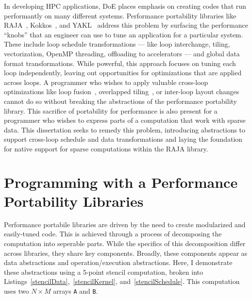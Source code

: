 In developing HPC applications, DoE places emphasis on creating codes that run performantly on many different systems.
Performance portability libraries like RAJA~\cite{hornung2014RAJA}, Kokkos~\cite{edwards2014kokkos}, and YAKL~\cite{norman2022portable} address this problem by surfacing the performance ``knobs'' that an engineer can use to tune an application for a particular system. 
These include loop schedule transformations --- like loop interchange, tiling, vectorization, OpenMP threading, offloading to accelerators --- and global data format transformations.
While powerful, this approach focuses on tuning each loop independently, leaving out opportunities for optimizations that are applied across loops.
A programmer who wishes to apply valuable cross-loop optimizations like loop fusion~\cite{todo}, overlapped tiling~\cite{bertolacci2019using,todoCathySCPaper, todoOVerlappedTilingIntroPaper}, or inter-loop layout changes~\cite{kennedy1995automatic,kennedy1998automatic} cannot do so without breaking the abstractions of the performance portability library.
This sacrifice of portability for performance is also present for a programmer who wishes to express parts of a computation that work with sparse data.
This dissertation seeks to remedy this problem, introducing abstractions to support cross-loop schedule and data transformations and laying the foundation for native support for sparse computations within the RAJA library.

\section{Programming with a Performance Portability Libraries}
Performance portabile libraries are driven by the need to create modularized and easily-tuned code.
This is achieved through a process of decomposing the computation into seperable parts.
While the specifics of this decomposition differ across libraries, they share key components.
Broadly, these components appear as data abstractions and operation/execution abstractions.
Here, I demonstrate these abstractions using a 5-point stencil computation, broken into Listings~\ref{stencilData},~\ref{stencilKernel}, and~\ref{stencilSchedule}.
This computation uses two $N \times M$ arrays \verb.A. and \verb.B..


